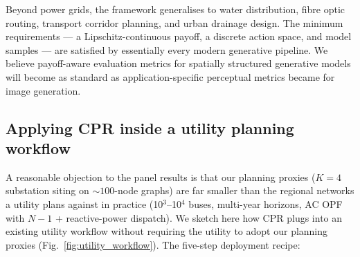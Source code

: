 \documentclass[10pt,a4paper]{article}
\begin{document}
Beyond power grids, the framework generalises to water
distribution, fibre optic routing, transport corridor planning,
and urban drainage design. The minimum requirements --- a
Lipschitz-continuous payoff, a discrete action space, and model
samples --- are satisfied by essentially every modern generative
pipeline. We believe payoff-aware evaluation metrics for spatially
structured generative models will become as standard as
application-specific perceptual metrics became for image
generation.

\subsection{Applying CPR inside a utility planning workflow}
\label{sec:utility_workflow}

A reasonable objection to the panel results is that our planning
proxies ($K{=}4$ substation siting on $\sim{100}$-node graphs) are
far smaller than the regional networks a utility plans against in
practice (10$^3$--10$^4$ buses, multi-year horizons, AC OPF with
$N{-}1$ + reactive-power dispatch). We sketch here how CPR plugs
into an existing utility workflow without requiring the utility to
adopt our planning proxies (Fig.~\ref{fig:utility_workflow}). The
five-step deployment recipe:
\end{document}
